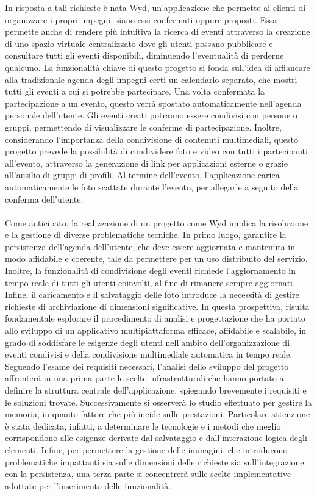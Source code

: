 \clearpage
In risposta a tali richieste è nata Wyd, un'applicazione che permette ai clienti di organizzare i propri impegni, siano essi confermati oppure proposti. Essa permette anche di rendere più intuitiva la ricerca di eventi attraverso la creazione di uno spazio virtuale centralizzato dove gli utenti possano pubblicare e consultare tutti gli eventi disponibili, diminuendo l’eventualità di perderne qualcuno. 
La funzionalità chiave di questo progetto si fonda sull'idea di affiancare alla tradizionale agenda degli impegni certi un calendario separato, che mostri tutti gli eventi a cui si potrebbe partecipare. Una volta confermata la partecipazione a un evento, questo verrà spostato automaticamente nell'agenda personale dell'utente.
Gli eventi creati potranno essere condivisi con persone o gruppi, permettendo di visualizzare le conferme di partecipazione. 
Inoltre, considerando l'importanza della condivisione di contenuti multimediali, questo progetto prevede la possibilità di condividere foto e video con tutti i partecipanti all'evento, attraverso la generazione di link per applicazioni esterne o grazie all'ausilio di gruppi di profili. Al termine dell’evento,
l'applicazione carica automaticamente le foto scattate durante l'evento,
per allegarle a seguito della conferma dell'utente.\\
\\
Come anticipato, la realizzazione di un progetto come Wyd implica la risoluzione e la gestione di diverse problematiche tecniche. 
In primo luogo, garantire la persistenza dell'agenda dell'utente, che deve essere aggiornata e mantenuta in modo affidabile e coerente, tale da permettere per un uso distribuito del servizio. 
Inoltre, la funzionalità di condivisione degli eventi richiede l'aggiornamento in tempo reale di tutti gli utenti coinvolti, al fine di rimanere sempre aggiornati. 
Infine, il caricamento e il salvataggio delle foto introduce la necessità di gestire richieste di archiviazione di dimensioni significative.
In questa prospettiva, risulta fondamentale esplorare il procedimento di analisi e progettazione che ha portato allo sviluppo di un applicativo multipiattaforma efficace, affidabile e scalabile, in grado di soddisfare le esigenze degli utenti nell’ambito dell'organizzazione di eventi condivisi e della condivisione multimediale automatica in tempo reale.
Seguendo l’esame dei requisiti necessari, l’analisi dello sviluppo del progetto affronterà in una prima parte le scelte infrastrutturali che hanno portato a definire la struttura centrale dell’applicazione, spiegando brevemente i requisiti e le soluzioni trovate. 
Successivamente si osserverà lo studio effettuato per gestire la memoria, in quanto fattore che più incide sulle prestazioni. Particolare attenzione è stata dedicata, infatti, a determinare le tecnologie e i metodi che meglio corrispondono alle esigenze derivate dal salvataggio e dall’interazione logica degli elementi.
Infine, per permettere la gestione delle immagini, che introducono problematiche impattanti sia sulle dimensioni delle richieste sia sull'integrazione con la persistenza, una terza parte si concentrerà sulle scelte implementative adottate per l’inserimento delle funzionalità.


\clearpage
